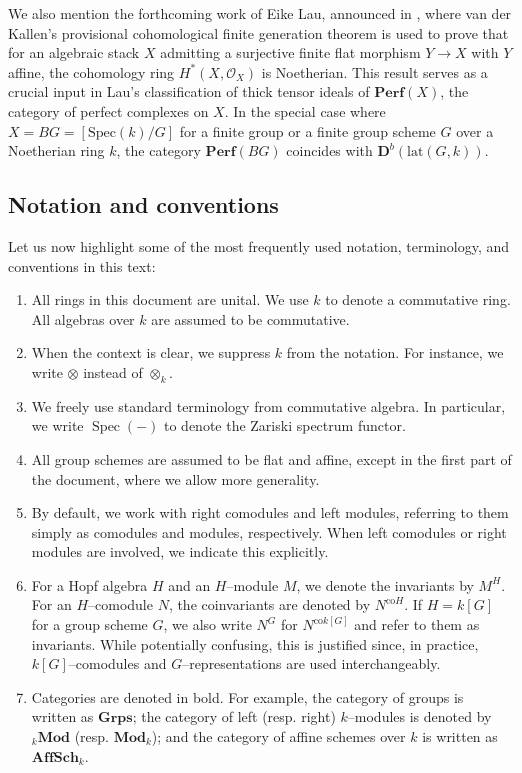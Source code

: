 \documentclass{article}
\theoremstyle{plain}
\theoremstyle{definition}
\DeclareMathOperator{\Spec}{Spec}
\begin{document}
We also mention the forthcoming work of Eike Lau, announced in \cite{Lau2023}, where van der Kallen’s provisional cohomological finite generation theorem is used to prove that for an algebraic stack $X$ admitting a surjective finite flat morphism $Y \to X$ with $Y$ affine, the cohomology ring $H^\ast(X,\mathcal{O}_X)$ is Noetherian. This result serves as a crucial input in Lau’s classification of thick tensor ideals of $\mathbf{Perf}(X)$, the category of perfect complexes on $X$. In the special case where $X = BG = [\mathrm{Spec}(k)/G]$ for a finite group or a finite group scheme $G$ over a Noetherian ring $k$, the category $\mathbf{Perf}(BG)$ coincides with $\mathbf{D}^b(\mathrm{lat}(G,k))$. 


\subsection*{Notation and conventions}
 Let us now highlight some of the most frequently used notation, terminology, and conventions in this text: 
 
 \begin{enumerate} 
     \item All rings in this document are unital.  We use $k$ to denote a commutative ring. All algebras over $k$ are assumed to be commutative.
     \item When the context is clear, we suppress $k$ from the notation. For instance, we write $\otimes$ instead of $\otimes_k$.
     \item We freely use standard terminology from commutative algebra. In particular, we write $\Spec(-)$ to denote the Zariski spectrum functor.
     \item  All group schemes are assumed to be flat and affine, except in the first part of the document, where we allow more generality.
     \item By default, we work with right comodules and left modules, referring to them simply as comodules and modules, respectively. When left comodules or right modules are involved, we indicate this explicitly. 
     \item For a Hopf algebra $H$ and an $H$--module $M$, we denote the invariants by $M^H$. For an $H$--comodule $N$, the coinvariants are denoted by $N^{\text{co}H}$. If $H = k[G]$ for a group scheme $G$, we also write $N^G$ for $N^{\text{co}k[G]}$ and refer to them as invariants. While potentially confusing, this is justified since, in practice, $k[G]$--comodules and $G$--representations are used interchangeably.  
     \item Categories are denoted in bold. For example, the category of groups is written as $\textbf{Grps}$; the category of left (resp. right) $k$--modules is denoted by $_k\textbf{Mod}$ (resp. $\textbf{Mod}_k$); and the category of affine schemes over $k$ is written as $\textbf{AffSch}_k$.
    \end{enumerate}
\end{document}
